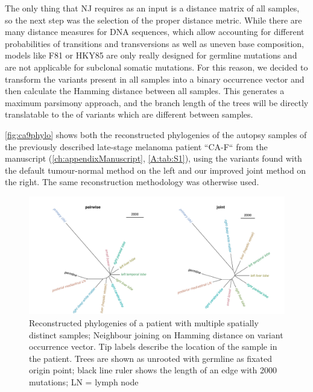 The only thing that NJ requires as an input is a distance matrix of all samples, so the next step was the selection of the proper distance metric. While there are many distance measures for DNA sequences, which allow accounting for different probabilities of transitions and transversions as well as uneven base composition, models like F81 \cite{Felsenstein1981} or HKY85 \cite{Hasegawa1985} are only really designed for germline mutations and are not  applicable for subclonal somatic mutations. For this reason, we decided  to transform the variants present in all samples into a binary occurrence vector and then calculate the Hamming distance \cite{Hamming1950} between all samples. This  generates a maximum parsimony approach, and the branch length of the trees will be directly translatable to the  of variants which are different between samples. 

\autoref{fig:ca9phylo} shows both the reconstructed phylogenies of the autopsy samples of the previously described late-stage melanoma patient ``CA-F`` from the manuscript (\autoref{ch:appendixManuscript}, \autoref{A:tab:S1}), using the variants found with the default tumour-normal method on the left and our improved joint method on the right. The same reconstruction methodology was otherwise used.

\begin{figure}[ht]
\centering
\includegraphics[width=.99\linewidth]{Figures/jointVariantCalling/phyloCA9.pdf}
\caption[Reconstructed phylogenies of joint samples]{Reconstructed phylogenies of a patient with multiple spatially distinct samples; Neighbour joining on Hamming distance on variant occurrence vector. Tip labels describe the location of the sample in the patient. Trees are shown as unrooted with germline as fixated origin point; black line ruler shows the length of an edge with 2000 mutations; LN = lymph node}\label{fig:ca9phylo}
\end{figure}


